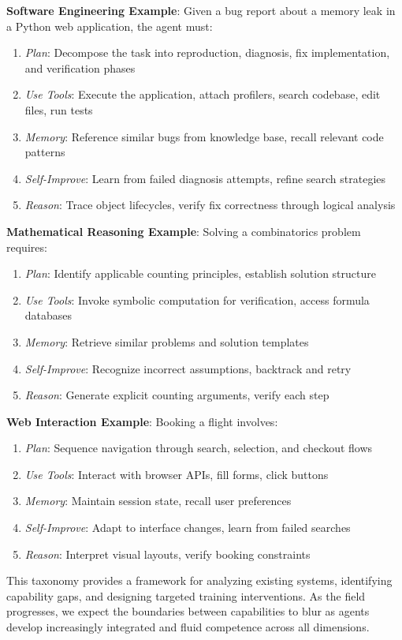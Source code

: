 \textbf{Software Engineering Example}: Given a bug report about a memory leak in a Python web application, the agent must:
\begin{enumerate}
    \item \textit{Plan}: Decompose the task into reproduction, diagnosis, fix implementation, and verification phases
    \item \textit{Use Tools}: Execute the application, attach profilers, search codebase, edit files, run tests
    \item \textit{Memory}: Reference similar bugs from knowledge base, recall relevant code patterns
    \item \textit{Self-Improve}: Learn from failed diagnosis attempts, refine search strategies
    \item \textit{Reason}: Trace object lifecycles, verify fix correctness through logical analysis

\end{enumerate}
\textbf{Mathematical Reasoning Example}: Solving a combinatorics problem requires:
\begin{enumerate}
    \item \textit{Plan}: Identify applicable counting principles, establish solution structure
    \item \textit{Use Tools}: Invoke symbolic computation for verification, access formula databases
    \item \textit{Memory}: Retrieve similar problems and solution templates
    \item \textit{Self-Improve}: Recognize incorrect assumptions, backtrack and retry
    \item \textit{Reason}: Generate explicit counting arguments, verify each step

\end{enumerate}
\textbf{Web Interaction Example}: Booking a flight involves:
\begin{enumerate}
    \item \textit{Plan}: Sequence navigation through search, selection, and checkout flows
    \item \textit{Use Tools}: Interact with browser APIs, fill forms, click buttons
    \item \textit{Memory}: Maintain session state, recall user preferences
    \item \textit{Self-Improve}: Adapt to interface changes, learn from failed searches
    \item \textit{Reason}: Interpret visual layouts, verify booking constraints

\end{enumerate}
This taxonomy provides a framework for analyzing existing systems, identifying capability gaps, and designing targeted training interventions. As the field progresses, we expect the boundaries between capabilities to blur as agents develop increasingly integrated and fluid competence across all dimensions.

